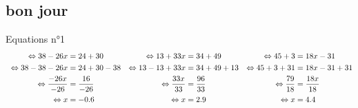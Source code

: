 \documentclass{article}%
\begin{document}
\subsection{bon jour}%
\label{subsec:bonjour}%
Equations n°1%
\begin{align*}%
\vspace{10mm}%
\newline%
\  \Leftrightarrow 38 - 26x &= 24 + 30     & \Leftrightarrow 13 + 33x  &= 34 + 49       & \Leftrightarrow 45 + 3 &= 18x - 31\\%
\vspace{5mm}%
\newline%
\  \Leftrightarrow 38 - 38 - 26x &= 24 + 30 -38      & \Leftrightarrow 13 - 13 + 33x  &= 34 + 49 + 13        & \Leftrightarrow 45 + 3 + 31 &= 18x - 31 +31\\%
\vspace{5mm}%
\newline%
\  \Leftrightarrow \frac{-26x}{-26} &= \frac{16}{-26}      & \Leftrightarrow \frac{33x}{33} &= \frac{96}{33}      & \Leftrightarrow \frac{79}{18} &= \frac{18x}{18}\\%
\vspace{5mm}%
\newline%
\  \Leftrightarrow  x &= -0.6      & \Leftrightarrow  x &= 2.9      & \Leftrightarrow  x &= 4.4\\%
\end{align*}

%
\newpage%
\end{document}
